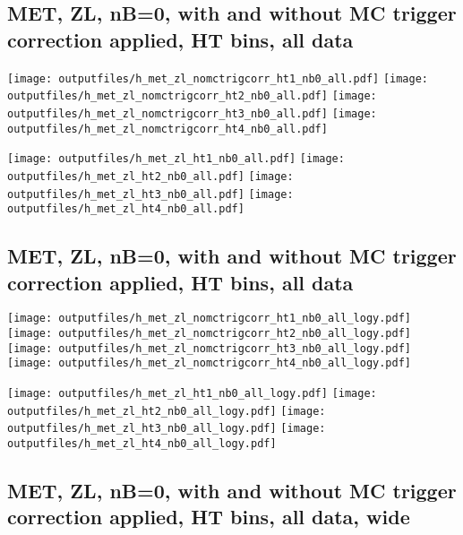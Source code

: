 \documentclass[11pt]{article}
\begin{document}
    \clearpage
     \subsection{ MET, ZL, nB=0, with and without MC trigger correction applied, HT bins, all data}

    \noindent
     \texttt{[image: outputfiles/h\_met\_zl\_nomctrigcorr\_ht1\_nb0\_all.pdf]}
     \texttt{[image: outputfiles/h\_met\_zl\_nomctrigcorr\_ht2\_nb0\_all.pdf]}
     \texttt{[image: outputfiles/h\_met\_zl\_nomctrigcorr\_ht3\_nb0\_all.pdf]}
     \texttt{[image: outputfiles/h\_met\_zl\_nomctrigcorr\_ht4\_nb0\_all.pdf]}

    \noindent
     \texttt{[image: outputfiles/h\_met\_zl\_ht1\_nb0\_all.pdf]}
     \texttt{[image: outputfiles/h\_met\_zl\_ht2\_nb0\_all.pdf]}
     \texttt{[image: outputfiles/h\_met\_zl\_ht3\_nb0\_all.pdf]}
     \texttt{[image: outputfiles/h\_met\_zl\_ht4\_nb0\_all.pdf]}

    \clearpage
     \subsection{ MET, ZL, nB=0, with and without MC trigger correction applied, HT bins, all data}

    \noindent
     \texttt{[image: outputfiles/h\_met\_zl\_nomctrigcorr\_ht1\_nb0\_all\_logy.pdf]}
     \texttt{[image: outputfiles/h\_met\_zl\_nomctrigcorr\_ht2\_nb0\_all\_logy.pdf]}
     \texttt{[image: outputfiles/h\_met\_zl\_nomctrigcorr\_ht3\_nb0\_all\_logy.pdf]}
     \texttt{[image: outputfiles/h\_met\_zl\_nomctrigcorr\_ht4\_nb0\_all\_logy.pdf]}


    \noindent
     \texttt{[image: outputfiles/h\_met\_zl\_ht1\_nb0\_all\_logy.pdf]}
     \texttt{[image: outputfiles/h\_met\_zl\_ht2\_nb0\_all\_logy.pdf]}
     \texttt{[image: outputfiles/h\_met\_zl\_ht3\_nb0\_all\_logy.pdf]}
     \texttt{[image: outputfiles/h\_met\_zl\_ht4\_nb0\_all\_logy.pdf]}


   \clearpage
     \subsection{ MET, ZL, nB=0, with and without MC trigger correction applied, HT bins, all data, wide}
\end{document}
